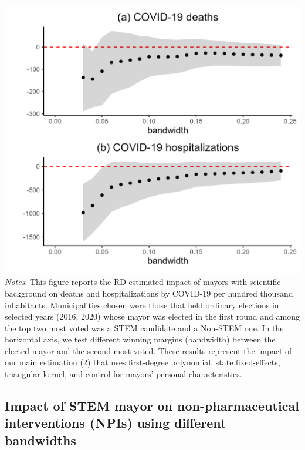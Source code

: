 \documentclass[
  letterpaper,
  DIV=11,
  numbers=noendperiod]{scrartcl}
\begin{document}
\includegraphics{outputs/figures/robust_outcomes.png} \emph{Notes}: This
figure reports the RD estimated impact of mayors with scientific
background on deaths and hospitalizations by COVID-19 per hundred
thousand inhabitants. Municipalities chosen were those that held
ordinary elections in selected years (2016, 2020) whose mayor was
elected in the first round and among the top two most voted was a STEM
candidate and a Non-STEM one. In the horizontal axis, we test different
winning margins (bandwidth) between the elected mayor and the second
most voted. These results represent the impact of our main estimation
(2) that uses first-degree polynomial, state fixed-effects, triangular
kernel, and control for mayors' personal characteristics.

\subsection{Impact of STEM mayor on non-pharmaceutical interventions
(NPIs) using different
bandwidths}\label{impact-of-stem-mayor-on-non-pharmaceutical-interventions-npis-using-different-bandwidths}
\end{document}
